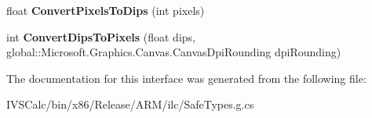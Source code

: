 \begin{DoxyCompactItemize}
\item 
\mbox{\label{interface_microsoft_1_1_graphics_1_1_canvas_1_1_i_canvas_resource_creator_with_dpi_ab822057561c60e367090d8542a623109}} 
float {\bfseries Convert\+Pixels\+To\+Dips} (int pixels)
\item 
\mbox{\label{interface_microsoft_1_1_graphics_1_1_canvas_1_1_i_canvas_resource_creator_with_dpi_ae420e3ef2a8d6cc42c2d736970520431}} 
int {\bfseries Convert\+Dips\+To\+Pixels} (float dips, global\+::\+Microsoft.\+Graphics.\+Canvas.\+Canvas\+Dpi\+Rounding dpi\+Rounding)
\end{DoxyCompactItemize}


The documentation for this interface was generated from the following file\+:\begin{DoxyCompactItemize}
\item 
I\+V\+S\+Calc/bin/x86/\+Release/\+A\+R\+M/ilc/Safe\+Types.\+g.\+cs\end{DoxyCompactItemize}
